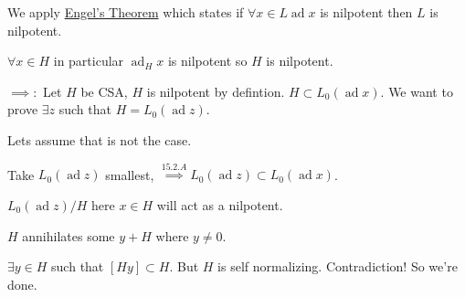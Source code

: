 \documentclass{article}
\theoremstyle{definition}
\begin{document}
We apply \underline{Engel's Theorem} which states if \(\forall x\in L \operatorname{ad} x\) is nilpotent then \(L\) is nilpotent.

\(\forall x\in H\) in particular \(\operatorname{ad}_H x\) is nilpotent so \(H\) is nilpotent.

\(\implies:\) Let \(H\) be CSA, \(H\) is nilpotent by defintion. \(H \subset L_0(\operatorname{ad} x)\). We want to prove \(\exists z\) such that \(H = L_0(\operatorname{ad} z)\).

Lets assume that is not the case.

Take \(L_0(\operatorname{ad} z)\) smallest, \(\overset{15.2.A}{\implies} L_0(\operatorname{ad} z) \subset L_0(\operatorname{ad} x)\).

\(L_0(\operatorname{ad} z) / H\) here \(x\in H\) will act as a nilpotent.

\(H\) annihilates some \(y+H\) where \(y\neq 0\).

\(\exists y\in H\) such that \([Hy] \subset H\). But \(H\) is self normalizing. Contradiction! So we're done.
\end{document}

